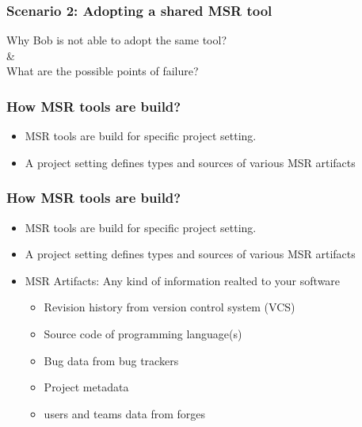         \begin{frame}
            \frametitle{Scenario 2: Adopting a shared MSR tool}
             \centering
                Why Bob is not able to adopt the same tool? \\
                \& \\
                What are the possible points of failure?
        \end{frame}

        \begin{frame}
            \frametitle{How MSR tools are build?}
            \begin{itemize}
                \item MSR tools are build for specific project setting.
                \item A project setting defines types and sources of various MSR artifacts
            \end{itemize}
        \end{frame}

                \begin{frame}
                    \frametitle{How MSR tools are build?}
                    \begin{itemize}
                        \item MSR tools are build for specific project setting.
                        \item A project setting defines types and sources of various MSR artifacts
                        \item MSR Artifacts: Any kind of information realted to your software
                        \begin{itemize}
                            \item Revision history from version control system (VCS)
                            \item Source code of programming language(s)
                            \item Bug data from bug trackers
                            \item Project metadata
                            \item users and teams data from forges
                        \end{itemize}
                    \end{itemize}
                \end{frame}

